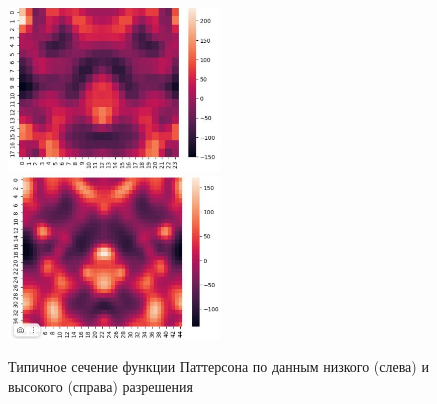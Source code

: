 \begin{figure}[H]
    \centering
    \includegraphics[width=0.5\textwidth]{figures/patt_high.png}\hfill
    \includegraphics[width=0.5\textwidth]{figures/patt_low.png}
    \caption{Типичное сечение функции Паттерсона по данным низкого (слева) и высокого (справа) разрешения}
    \label{patt}
\end{figure}